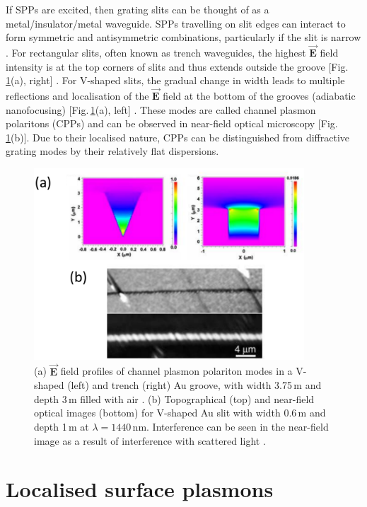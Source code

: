 If SPPs are excited, then grating slits can be thought of as a metal/insulator/metal waveguide. SPPs travelling on slit edges can interact to form symmetric and antisymmetric combinations, particularly if the slit is narrow \cite{Maier2007}. For rectangular slits, often known as trench waveguides, the highest $\vec{\mathbf{E}}$ field intensity is at the top corners of slits and thus extends outside the groove [Fig.\,\ref{3Fig6}(a), right] \cite{Bozhevolnyi2005, Srivastava2009, Chattopadhyay2012}. For V-shaped slits, the gradual change in width leads to multiple reflections and localisation of the $\vec{\mathbf{E}}$ field at the bottom of the grooves (adiabatic nanofocusing) [Fig.\,\ref{3Fig6}(a), left] \cite{Bozhevolnyi2005, Srivastava2009, Novikov2002, Kuttge2009, Sondergaard2012}. These modes are called channel plasmon polaritons (CPPs) and can be observed in near-field optical microscopy [Fig.\,\ref{3Fig6}(b)]. Due to their localised nature, CPPs can be distinguished from diffractive grating modes by their relatively flat dispersions.
\begin{figure}[h!] 
\centering    
\includegraphics[width=0.9\textwidth]{Fig6}
\caption{(a) $\vec{\mathbf{E}}$ field profiles of channel plasmon polariton modes in a V-shaped (left) and trench (right) Au groove, with width 3.75\,\textmu m and depth 3\,\textmu m filled with air \cite{Srivastava2009}. (b) Topographical (top) and near-field optical images (bottom) for V-shaped Au slit with width 0.6\,\textmu m and depth 1\,\textmu m at $\lambda=1440$\,nm. Interference can be seen in the near-field image as a result of interference with scattered light \cite{Bozhevolnyi2005}.}
\label{3Fig6}
\end{figure} 

\section{Localised surface plasmons}
